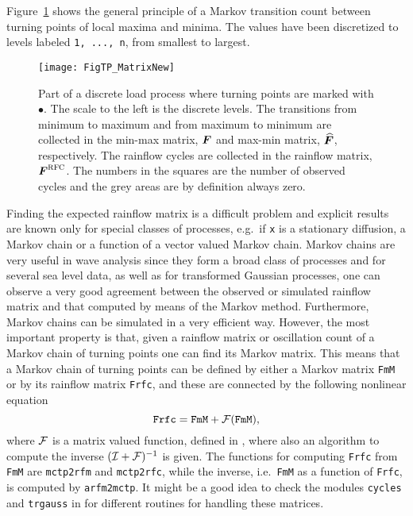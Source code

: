 Figure~\ref{fig:TP_Matrix} shows the general principle of a Markov
transition count between turning points of local maxima and minima.
The values have been discretized to levels labeled {\tt 1, ..., n}, from
smallest to largest.
\begin{figure}
  \centering
%   
\texttt{[image: FigTP\_MatrixNew]}
\vspace{-3mm}
  \caption[General principle of a Markov
transition count]{
Part of a discrete load process where turning points are
      marked with $\bullet$. The scale to the left is the discrete levels.
      The transitions from minimum to maximum and from
      maximum to minimum are collected in the min-max matrix,
      $\mbox{\boldmath $F$}$ and max-min matrix, $\mbox{\boldmath $\widehat F$}$, respectively.
      The rainflow cycles are collected in the rainflow matrix,
      $\mbox{\boldmath $F$}^{{\protect\mbox{\protect\small\protect\sc rfc}}}$. The numbers in the squares are the number of observed
      cycles and the grey areas are by definition always zero.
      }
  \label{fig:TP_Matrix}
\end{figure}

Finding the expected rainflow matrix is a difficult problem and explicit
results are known only for special classes of processes, e.g.\ if {\tt x}
is a stationary diffusion, a Markov chain or a function of a vector
valued Markov chain. Markov chains are very useful in wave
analysis
since they form a broad class of processes and for several sea level
data, as well as for transformed Gaussian processes, one can  observe a
very good agreement between the observed or simulated rainflow matrix and
that computed by means of the Markov method. Furthermore, Markov
chains can be simulated in a very efficient way. However, the most important
property is that, given a rainflow matrix or oscillation
count of a Markov chain of turning points one can find its
Markov matrix. This means that a Markov chain of turning points can
be defined by either a Markov matrix {\tt FmM} or by its rainflow matrix
{\tt Frfc}, and these are connected by the following nonlinear equation
\begin{equation}
\mbox{\tt Frfc} = \mbox{\tt FmM} + {\cal F}(\mbox{\tt FmM}),
\label{eq:rfc_mM_transformation}
\end{equation}
where ${\cal F}$ is a matrix valued function, defined in
\cite{Rychlik1995Simulation},
where also an algorithm to compute the inverse $({\cal I} + {\cal F})^{-1}$ is
given. The \progname{} functions for computing {\tt Frfc} from
{\tt FmM} are {\tt mctp2rfm}
and {\tt mctp2rfc},
while the
inverse, i.e.\  {\tt FmM} as a function of  {\tt Frfc},
is computed by {\tt arfm2mctp}.
It might be a good idea to check the modules {\tt cycles} and
{\tt trgauss} in \progname{}
for different routines for handling these matrices.

